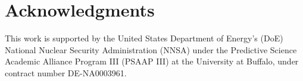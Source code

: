 \documentclass[conf]{new-aiaa}
\begin{document}
\section*{Acknowledgments}
This work is supported by the United States Department of Energy’s (DoE) National Nuclear Security Administration (NNSA) under the Predictive Science Academic Alliance Program III (PSAAP III) at the University at Buffalo, under contract number DE-NA0003961.


\end{document}
